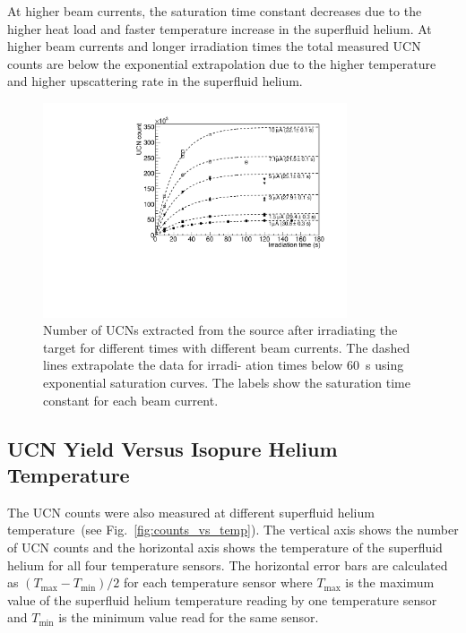 At higher beam currents, the saturation time constant decreases due to
the higher heat load and faster temperature increase in the superfluid
helium. At higher beam currents and longer irradiation times the total
measured UCN counts are below the exponential extrapolation due to the
higher temperature and higher upscattering rate in the superfluid
helium.

\begin{figure}[h!]
  \centering
  \includegraphics[width=0.8\textwidth]{UCNCounts_vs_irradTime.pdf}
  \caption{Number of UCNs extracted from the source after irradiating
    the target for different times with different beam currents. The
    dashed lines extrapolate the data for irradi- ation times below
    60~s using exponential saturation curves.  The labels show the
    saturation time constant for each beam current. }
  \label{fig:counts_vs_irrad}
\end{figure}


\subsection{UCN Yield Versus Isopure Helium Temperature}
The UCN counts were also measured at different superfluid helium
temperature~(see Fig.~\ref{fig:counts_vs_temp}). The vertical axis
shows the number of UCN counts and the horizontal axis shows the
temperature of the superfluid helium for all four temperature sensors.
The horizontal error bars are calculated as
$(T_{\mathrm{max}}-T_{\mathrm{min}})/2$ for each temperature sensor
where $T_{\mathrm{max}}$ is the maximum value of the superfluid helium
temperature reading by one temperature sensor and $T_{\mathrm{min}}$
is the minimum value read for the same sensor.

